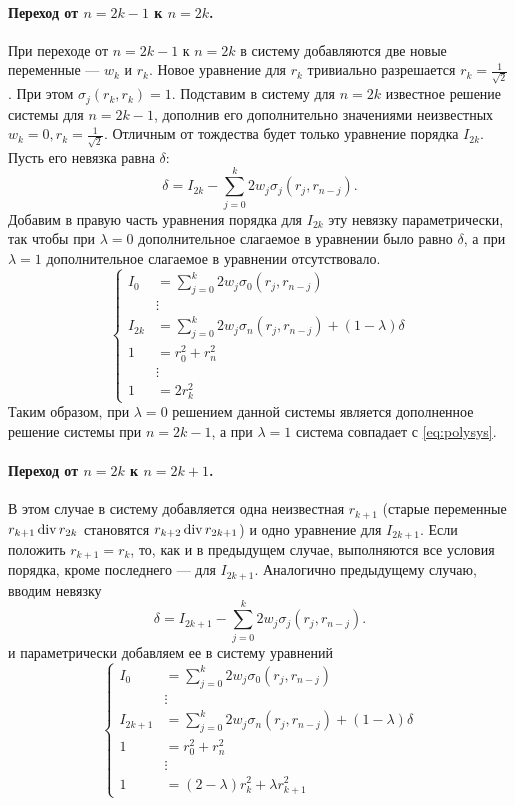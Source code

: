\paragraph{Переход от $n=2k-1$ к $n=2k$.}
При переходе от $n=2k-1$ к $n=2k$ в систему добавляются две новые переменные --- $w_k$ и $r_k$. 
Новое уравнение для $r_k$ тривиально разрешается $r_k = \frac{1}{\sqrt{2}}$. При этом $\sigma_j(r_k,r_k) = 1$.
Подставим в систему для $n=2k$ известное решение системы для $n=2k-1$, дополнив его дополнительно
значениями неизвестных $w_k=0, r_k = \frac{1}{\sqrt{2}}$. Отличным от тождества будет только уравнение порядка $I_{2k}$.
Пусть его невязка равна $\delta$:
\[
\delta = I_{2k} - \sum_{j=0}^{k} 2w_j\sigma_j(r_j, r_{n-j}).
\]
Добавим в правую часть уравнения порядка для $I_{2k}$ эту невязку параметрически, так чтобы при $\lambda = 0$ дополнительное слагаемое в уравнении было равно $\delta$, а при $\lambda = 1$ дополнительное слагаемое в уравнении отсутствовало.
\begin{equation}
\begin{cases}
I_0 &= \displaystyle \sum_{j=0}^{k} 2 w_j \sigma_0(r_j,r_{n-j})\\
&\vdots\\
I_{2k} &= \displaystyle \sum_{j=0}^{k} 2 w_j \sigma_n(r_j,r_{n-j}) + (1-\lambda) \delta\\
1 &= r_0^2 + r_n^2\\
&\vdots\\
1 &= 2r_{k}^2
\end{cases}
\label{eq:parsyseven}
\end{equation}
Таким образом, при $\lambda = 0$ решением данной системы является дополненное решение системы при $n = 2k - 1$, а при $\lambda = 1$ система совпадает с \eqref{eq:polysys}.

\paragraph{Переход от $n=2k$ к $n=2k+1$.} В этом случае в систему добавляется одна неизвестная $r_{k+1}$ (старые переменные $r_{k+1} \dividesymbol r_{2k}$ становятся $r_{k+2} \dividesymbol r_{2k+1}$) и одно уравнение для $I_{2k+1}$. Если положить $r_{k+1} = r_k$, то, как и в предыдущем случае, выполняются все условия порядка, кроме последнего --- для $I_{2k+1}$. Аналогично предыдущему случаю, вводим невязку
\[
\delta = I_{2k+1} - \sum_{j=0}^{k} 2w_j\sigma_j(r_j, r_{n-j}).
\]
и параметрически добавляем ее в систему уравнений
\begin{equation}
\begin{cases}
I_0 &=  \sum_{j=0}^{k} 2 w_j \sigma_0(r_j,r_{n-j})\\
&\vdots\\
I_{2k+1} &=  \sum_{j=0}^{k} 2 w_j \sigma_n(r_j,r_{n-j}) + (1-\lambda) \delta\\
1 &=  r_0^2 + r_n^2\\
&\vdots\\
1  &= \displaystyle (2-\lambda)r_{k}^2+\lambda r_{k+1}^2
\end{cases}
\label{eq:parsysodd}
\end{equation}

